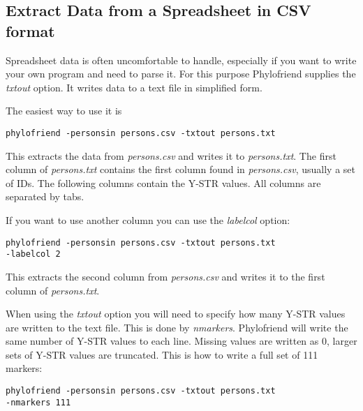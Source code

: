 \subsection{Extract Data from a Spreadsheet in CSV format}

Spreadsheet data is often uncomfortable to handle, especially
if you want to write your own program and need to parse it.
For this purpose Phylofriend supplies the \emph{txtout}
option. It writes data to a text file in simplified form.

The easiest way to use it is

\vspace{1ex}
\noindent\texttt{phylofriend -personsin persons.csv -txtout persons.txt}
\vspace{1ex}

\noindent
This extracts the data from \emph{persons.csv} and writes
it to \emph{persons.txt}. The first column of \emph{persons.txt}
contains the first column found in \emph{persons.csv}, usually
a set of IDs. The following columns contain the Y-STR values.
All columns are separated by tabs.

If you want to use another column you can use the
\emph{labelcol} option:

\vspace{1ex}
\noindent\texttt{phylofriend -personsin persons.csv -txtout persons.txt\\
-labelcol 2}
\vspace{1ex}

\noindent
This extracts the second column from \emph{persons.csv} and
writes it to the first column of \emph{persons.txt}.

When using the \emph{txtout} option you will need to specify
how many Y-STR values are written to the text file. This is
done by \emph{nmarkers}. Phylofriend will write the same number
of Y-STR values to each line. Missing values are written as
0, larger sets of Y-STR values are truncated. This is how to
write a full set of 111 markers:

\vspace{1ex}
\noindent\texttt{phylofriend -personsin persons.csv -txtout persons.txt\\
-nmarkers 111}
















